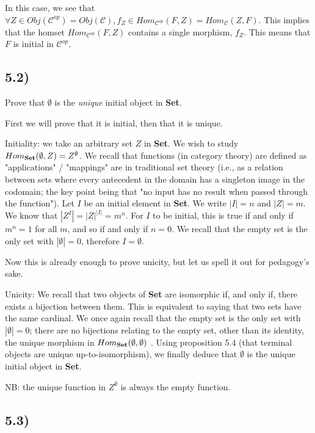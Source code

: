 \documentclass[12pt, letterpaper, twoside]{report}
\begin{document}
In this case, we see that $\forall Z \in Obj(\mathcal{C}^{op}) = Obj(\mathcal{C}), f_Z \in Hom_{\mathcal{C}^{op}} (F, Z) = Hom_{\mathcal{C}} (Z, F)$. This implies that the homset $Hom_{\mathcal{C}^{op}} (F, Z)$ contains a single morphism, $f_Z$. This means that $F$ is initial in $\mathcal{C}^{op}$.




\subsection*{5.2)}

Prove that $\emptyset$ is the \textit{unique} initial object in \textbf{Set}.

First we will prove that it is initial, then that it is unique.

Initiality: we take an arbitrary set $Z$ in \textbf{Set}. We wish to study $Hom_{\text{\textbf{Set}}}(\emptyset, Z) = Z^\emptyset$. We recall that functions (in category theory) are defined as "applications" / "mappings" are in traditional set theory (i.e., as a relation between sets where every antecedent in the domain has a singleton image in the codomain; the key point being that "no input has no result when passed through the function"). Let $I$ be an initial element in \textbf{Set}. We write $|I| = n$ and $|Z| = m$. We know that $|Z^I| = |Z|^{|I|} = m^n$. For $I$ to be initial, this is true if and only if $m^n = 1$ for all $m$, and so if and only if $n = 0$. We recall that the empty set is the only set with $|\emptyset| = 0$, therefore $I = \emptyset$.

Now this is already enough to prove unicity, but let us spell it out for pedagogy's sake.

Unicity: We recall that two objects of \textbf{Set} are isomorphic if, and only if, there exists a bijection between them. This is equivalent to saying that two sets have the same cardinal. We once again recall that the empty set is the only set with $|\emptyset| = 0$; there are no bijections relating to the empty set, other than its identity, the unique morphism in $Hom_{\text{\textbf{Set}}}(\emptyset, \emptyset)$ . Using proposition 5.4 (that terminal objects are unique up-to-isomorphism), we finally deduce that $\emptyset$ is the unique initial object in \textbf{Set}.

NB: the unique function in $Z^\emptyset$ is always the empty function.



\subsection*{5.3)}
\end{document}
